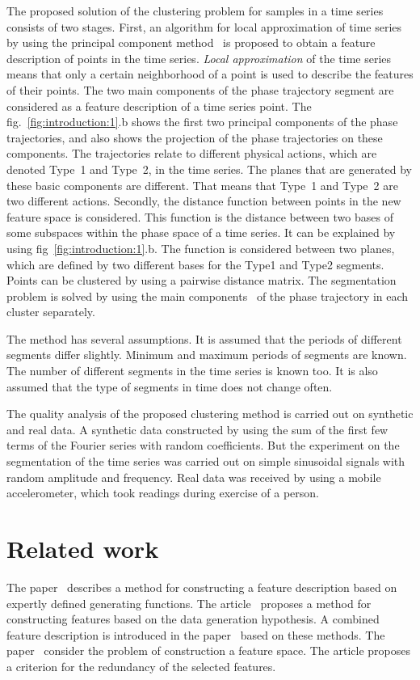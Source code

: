 \documentclass[12pt, twoside]{article}
\numberwithin{equation}{section}
\begin{document}
The proposed solution of the clustering problem for samples in a time series consists of two stages.
First, an algorithm for local approximation of time series by using the principal component method~\cite{Shiglavsi1997} is proposed to obtain a feature description of points in the time series.
\textit{Local approximation} of the time series means that only a certain neighborhood of a point is used to describe the features of their points.
The two main components of the phase trajectory segment are considered as a feature description of a time series point.
The fig.~\ref{fig:introduction:1}.b shows the first two principal components of the phase trajectories, and also shows the projection of the phase trajectories on these components.
The trajectories relate to different physical actions, which are denoted Type~1 and Type~2, in the time series.
The planes that are generated by these basic components are different.
That means that Type~1 and Type~2 are two different actions.
Secondly, the distance function between points in the new feature space is considered.
This function is the distance between two bases of some subspaces within the phase space of a time series.
It can be explained by using fig~\ref{fig:introduction:1}.b. The function is considered between two planes, which are defined by two different bases for the Type1 and Type2 segments.
Points can be clustered by using a pairwise distance matrix. 
The segmentation problem is solved by using the main components~\cite{motrenko2015} of the phase trajectory in each cluster separately.

The method has several assumptions.
It is assumed that the periods of different segments differ slightly. Minimum and maximum periods of segments are known. The number of different segments in the time series is known too.
It is also assumed that the type of segments in time does not change often.

The quality analysis of the proposed clustering method is carried out on synthetic and real data.
A synthetic data constructed by using the sum of the first few terms of the Fourier series with random coefficients. But the experiment on the segmentation of the time series was carried out on simple sinusoidal signals with random amplitude and frequency.
Real data was received by using a mobile accelerometer, which took readings during exercise of a person.

\section{Related work}
The paper~\cite{kwapisz2010} describes a method for constructing a feature description based on expertly defined generating functions.
The article~\cite{lukashin2003} proposes a method for constructing features based on the data generation hypothesis.
A combined feature description is introduced in the paper~\cite{Ivkin2015} based on these methods.
The paper~\cite{Katrutsa2015} consider the problem of construction a feature space. The article proposes a criterion for the redundancy of the selected features.
\end{document}
